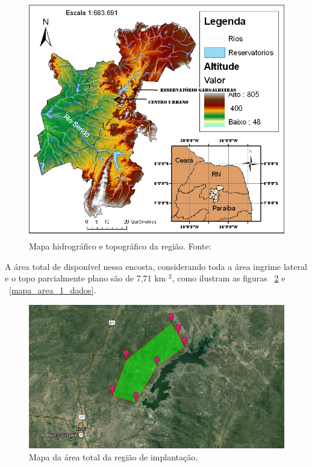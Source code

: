     \begin{figure}[h]
    \begin{center}
      \includegraphics[scale=0.4]{editaveis/figuras/mapa_topografico}
      \caption[Mapa hidrográfico e topográfico da região]{Mapa hidrográfico e topográfico da região. Fonte: \cite{olimpio07}}
      \label{mapa_topografico}
    \end{center}
    \end{figure}
    \FloatBarrier
    
    A área total de disponível nessa encosta, considerando toda a área ingrime lateral e o topo parcialmente
    plano são de 7,71 km $^2$, como ilustram as figuras ~\ref{mapa_area_1} e ~\ref{mapa_area_1_dados}.
    
    \begin{figure}[h]
    \begin{center}
      \includegraphics[scale=0.6]{editaveis/figuras/mapa_area_1}
      \caption[Mapa da área total da região de implantação]{Mapa da área total da região de implantação. \footnotemark}
      \label{mapa_area_1}
    \end{center}
    \end{figure}
    \FloatBarrier
    
